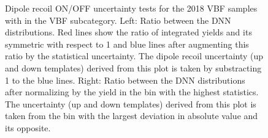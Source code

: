 \documentclass[../main.tex]{subfiles}
\begin{document}
\begin{figure}[t!]
\begin{center}
\end{center}
\caption[Dipole recoil uncertainties]{Dipole recoil ON/OFF uncertainty tests for the 2018 VBF samples with  in the VBF subcategory. Left: Ratio between the DNN distributions. Red lines show the ratio of integrated yields and its symmetric with respect to 1 and blue lines after augmenting this ratio by the statistical uncertainty. The dipole recoil uncertainty (up and down templates) derived from this plot is taken by substracting 1 to the blue lines. Right: Ratio between the DNN distributions after normalizing by the yield in the bin with the highest statistics. The uncertainty (up and down templates) derived from this plot is taken from the bin with the largest deviation in absolute value and its opposite.}
\label{hh:fig:dipole_recoil}

\end{figure}
\end{document}
